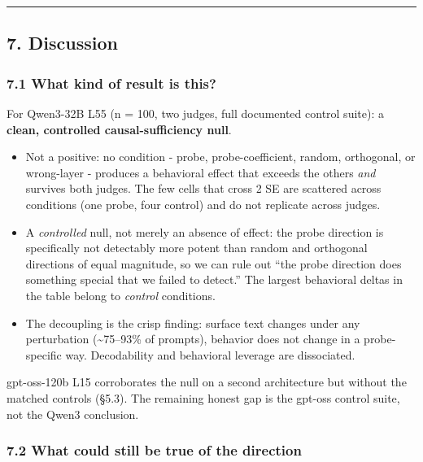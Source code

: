 \documentclass[
]{article}
\providecommand{\tightlist}{%
  \setlength{\itemsep}{0pt}\setlength{\parskip}{0pt}}
\begin{document}
\begin{center}\rule{0.5\linewidth}{0.5pt}\end{center}

\subsection{7. Discussion}\label{discussion}

\subsubsection{7.1 What kind of result is
this?}\label{what-kind-of-result-is-this}

For Qwen3-32B L55 (n = 100, two judges, full documented control suite):
a \textbf{clean, controlled causal-sufficiency null}.

\begin{itemize}
\tightlist
\item
  Not a positive: no condition - probe, probe-coefficient, random,
  orthogonal, or wrong-layer - produces a behavioral effect that exceeds
  the others \emph{and} survives both judges. The few cells that cross 2
  SE are scattered across conditions (one probe, four control) and do
  not replicate across judges.
\item
  A \emph{controlled} null, not merely an absence of effect: the probe
  direction is specifically not detectably more potent than random and
  orthogonal directions of equal magnitude, so we can rule out ``the
  probe direction does something special that we failed to detect.'' The
  largest behavioral deltas in the table belong to \emph{control}
  conditions.
\item
  The decoupling is the crisp finding: surface text changes under any
  perturbation (\textasciitilde75--93\% of prompts), behavior does not
  change in a probe-specific way. Decodability and behavioral leverage
  are dissociated.
\end{itemize}

gpt-oss-120b L15 corroborates the null on a second architecture but
without the matched controls (§5.3). The remaining honest gap is the
gpt-oss control suite, not the Qwen3 conclusion.

\subsubsection{7.2 What could still be true of the
direction}\label{what-could-still-be-true-of-the-direction}
\end{document}
